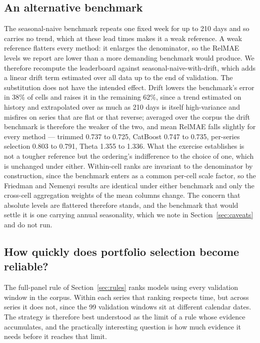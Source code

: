 \documentclass[11pt]{article}
\begin{document}
\subsection{An alternative benchmark}

The seasonal-naive benchmark repeats one fixed week for up to 210 days and so carries no trend, which at these lead times makes it a weak reference. A weak reference flatters every method: it enlarges the denominator, so the RelMAE levels we report are lower than a more demanding benchmark would produce. We therefore recompute the leaderboard against seasonal-naive-with-drift, which adds a linear drift term estimated over all data up to the end of validation. The substitution does not have the intended effect. Drift lowers the benchmark's error in 38\% of cells and raises it in the remaining 62\%, since a trend estimated on history and extrapolated over as much as 210 days is itself high-variance and misfires on series that are flat or that reverse; averaged over the corpus the drift benchmark is therefore the weaker of the two, and mean RelMAE falls slightly for every method --- trimmed 0.737 to 0.725, CatBoost 0.747 to 0.735, per-series selection 0.803 to 0.791, Theta 1.355 to 1.336. What the exercise establishes is not a tougher reference but the ordering's indifference to the choice of one, which is unchanged under either. Within-cell ranks are invariant to the denominator by construction, since the benchmark enters as a common per-cell scale factor, so the Friedman and Nemenyi results are identical under either benchmark and only the cross-cell aggregation weights of the mean columns change. The concern that absolute levels are flattered therefore stands, and the benchmark that would settle it is one carrying annual seasonality, which we note in Section~\ref{sec:caveats} and do not run.

\subsection{How quickly does portfolio selection become reliable?}
\label{sec:pooling}

The full-panel rule of Section~\ref{sec:rules} ranks models using every validation window in the corpus. Within each series that ranking respects time, but across series it does not, since the 99 validation windows sit at different calendar dates. The strategy is therefore best understood as the limit of a rule whose evidence accumulates, and the practically interesting question is how much evidence it needs before it reaches that limit.
\end{document}
